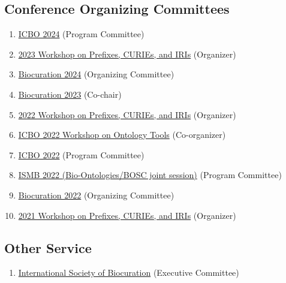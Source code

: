 \documentclass[10pt,a4paper,sans]{moderncv} %
\begin{document}
    \subsection{Conference Organizing Committees}
    \begin{enumerate}
        \item \href{https://icbo-conference.github.io/icbo2024/}{ICBO 2024} (Program Committee)
        \item \href{https://biopragmatics.github.io/workshops/WPCI2023.html}{2023 Workshop on Prefixes, CURIEs, and IRIs} (Organizer)
        \item \href{https://bioregistry.io/wikidata:Q122167907?provider=scholia}{Biocuration 2024} (Organizing Committee)
        \item \href{https://bioregistry.io/wikidata:Q111430238?provider=scholia}{Biocuration 2023} (Co-chair)
        \item \href{https://biopragmatics.github.io/workshops/WPCI2022.html}{2022 Workshop on Prefixes, CURIEs, and IRIs} (Organizer)
        \item \href{https://icbo-conference.github.io/icbo2022/workshops-and-tutorials/#workshop-on-ontology-tools-and-workflows}{ICBO 2022 Workshop on Ontology Tools} (Co-organizer)
        \item \href{https://icbo-conference.github.io/icbo2022/program-committee}{ICBO 2022} (Program Committee)
        \item \href{https://www.iscb.org/ismb2022-program/abstracts/bio-ontologies}{ISMB 2022 (Bio-Ontologies/BOSC joint session)} (Program Committee)
        \item \href{https://bioregistry.io/wikidata:Q109407979?provider=scholia}{Biocuration 2022} (Organizing Committee)
        \item \href{https://biopragmatics.github.io/workshops/WPCI2021.html}{2021 Workshop on Prefixes, CURIEs, and IRIs} (Organizer)
    \end{enumerate}

    \subsection{Other Service}
    \begin{enumerate}
        \item \href{https://bioregistry.io/wikidata:Q23809291?provider=scholia}{International Society of Biocuration} (Executive Committee)
    \end{enumerate}
\end{document}

